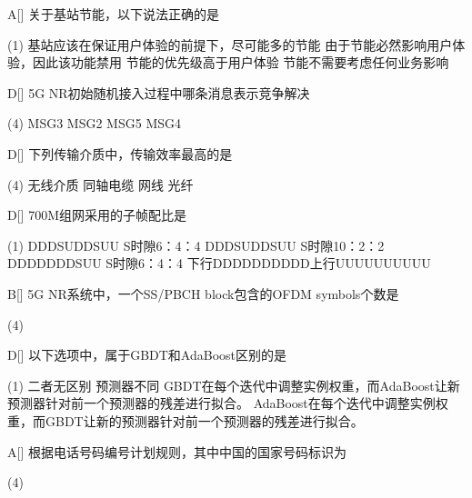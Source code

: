 \begin{choice}{A}[]
	关于基站节能，以下说法正确的是
	\begin{tasks}(1)
		\task 基站应该在保证用户体验的前提下，尽可能多的节能
		\task 由于节能必然影响用户体验，因此该功能禁用
		\task 节能的优先级高于用户体验
		\task 节能不需要考虑任何业务影响
	\end{tasks}
\end{choice}


\begin{choice}{D}[]
	5G NR初始随机接入过程中哪条消息表示竞争解决
	\begin{tasks}(4)
		\task MSG3
		\task MSG2
		\task MSG5
		\task MSG4
	\end{tasks}
\end{choice}

\begin{choice}{D}[]
	下列传输介质中，传输效率最高的是
	\begin{tasks}(4)
		\task 无线介质
		\task 同轴电缆
		\task 网线
		\task 光纤
	\end{tasks}
\end{choice}


\begin{choice}{D}[]
	700M组网采用的子帧配比是
	\begin{tasks}(1)
		\task DDDSUDDSUU S时隙6：4：4
		\task DDDSUDDSUU S时隙10：2：2
		\task DDDDDDDSUU S时隙6：4：4
		\task 下行DDDDDDDDDD上行UUUUUUUUUU
	\end{tasks}
\end{choice}


\begin{choice}{B}[]
	5G NR系统中，一个SS/PBCH block包含的OFDM symbols个数是
	\begin{tasks}(4)
	\end{tasks}
\end{choice}


\begin{choice}{D}[]
	以下选项中，属于GBDT和AdaBoost区别的是
	\begin{tasks}(1)
		\task 二者无区别
		\task 预测器不同
		\task GBDT在每个迭代中调整实例权重，而AdaBoost让新预测器针对前一个预测器的残差进行拟合。
		\task AdaBoost在每个迭代中调整实例权重，而GBDT让新的预测器针对前一个预测器的残差进行拟合。
	\end{tasks}
\end{choice}

\begin{choice}{A}[]
	根据电话号码编号计划规则，其中中国的国家号码标识为
	\begin{tasks}(4)
	\end{tasks}
\end{choice}

